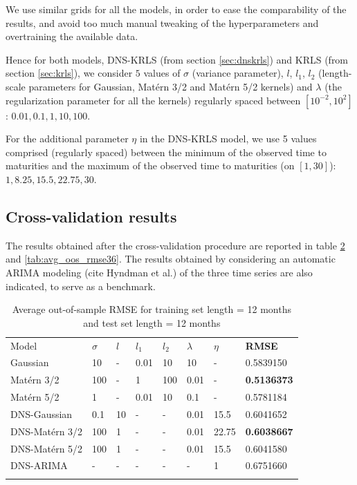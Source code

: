 \begin{table}[!htb]
We use similar grids for all the models, in order to ease the comparability of the results, and avoid too much manual tweaking of the hyperparameters and overtraining the available data. 

\medskip

Hence for both models, DNS-KRLS (from section \ref{sec:dnskrls}) and KRLS (from section \ref{sec:krls}), we consider $5$ values of $\sigma$ (variance parameter), $l$, $l_1$, $l_2$ (length-scale parameters for Gaussian, Mat\'ern 3/2 and Mat\'ern 5/2 kernels) and $\lambda$ (the regularization parameter for all the kernels) regularly spaced between $\left[ 10^{-2}, 10^2\right]$: $0.01, 0.1, 1, 10, 100$. 

\medskip

For the additional parameter $\eta$ in the DNS-KRLS model, we use 5 values comprised (regularly spaced) between the minimum of the observed time to maturities  and the maximum of the observed time to maturities (on $\left[1, 30\right]$): $1, 8.25, 15.5, 22.75, 30$.


\subsection{Cross-validation results}

The results obtained after the cross-validation procedure are reported in table \ref{tab:avg_oos_rmse12} and \ref{tab:avg_oos_rmse36}. The results obtained by considering an automatic ARIMA modeling (cite Hyndman et al.) of the three time series are also indicated, to serve as a benchmark. 

\begin{table}[!htb]
\begin{center}
\caption{Average out-of-sample RMSE for training set length = 12 months and test set length = 12 months}
\label{tab:avg_oos_rmse12}       %
\begin{tabular}{llllllll}
\hline\noalign{\smallskip}
Model              & $\sigma$ & $l$ & $l_1$ & $l_2$  & $\lambda$  & $\eta$  & \textbf{RMSE}  \\
\noalign{\smallskip}\hline\noalign{\smallskip}
  Gaussian         &    10 &  - &   0.01&    10 &    10 & - & 0.5839150 \\
  Mat\'ern 3/2     &   100 &  - & 1 & 100 &   0.01 & - & \textbf{0.5136373}\\
  Mat\'ern 5/2     &   1 & - & 0.01 & 10 & 0.1 & - & 0.5781184\\
\noalign{\smallskip}\hline\noalign{\smallskip}
  DNS-Gaussian     & 0.1 & 10 & - & - & 0.01 & 15.5 & 0.6041652\\
  DNS-Mat\'ern 3/2 & 100 & 1 & - & - & 0.01 & 22.75 & \textbf{0.6038667}\\
  DNS-Mat\'ern 5/2 & 100 & 1 & - & - & 0.01 & 15.5 & 0.6041580\\
  DNS-ARIMA & - & - & - & - & - & 1 & 0.6751660\\
\noalign{\smallskip}\hline
\end{tabular}
\end{center}
\end{table}


\end{table}
